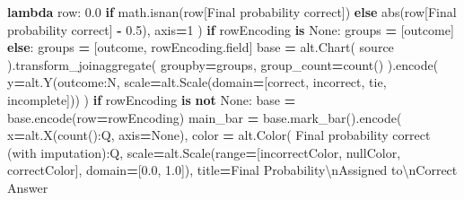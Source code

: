 \documentclass[
]{article}
\newenvironment{Shaded}{\begin{snugshade}}{\end{snugshade}}
\newcommand{\BuiltInTok}[1]{#1}
\newcommand{\CharTok}[1]{\textcolor[rgb]{0.31,0.60,0.02}{#1}}
\newcommand{\ControlFlowTok}[1]{\textcolor[rgb]{0.13,0.29,0.53}{\textbf{#1}}}
\newcommand{\DecValTok}[1]{\textcolor[rgb]{0.00,0.00,0.81}{#1}}
\newcommand{\FloatTok}[1]{\textcolor[rgb]{0.00,0.00,0.81}{#1}}
\newcommand{\KeywordTok}[1]{\textcolor[rgb]{0.13,0.29,0.53}{\textbf{#1}}}
\newcommand{\NormalTok}[1]{#1}
\newcommand{\OperatorTok}[1]{\textcolor[rgb]{0.81,0.36,0.00}{\textbf{#1}}}
\newcommand{\StringTok}[1]{\textcolor[rgb]{0.31,0.60,0.02}{#1}}
\newcommand{\VariableTok}[1]{\textcolor[rgb]{0.00,0.00,0.00}{#1}}
\begin{document}
\begin{Shaded}
\begin{Highlighting}[]
        \KeywordTok{lambda}\NormalTok{ row: }\FloatTok{0.0} \ControlFlowTok{if}\NormalTok{ math.isnan(row[}\StringTok{\textquotesingle{}Final probability correct\textquotesingle{}}\NormalTok{])}
        \ControlFlowTok{else} \BuiltInTok{abs}\NormalTok{(row[}\StringTok{\textquotesingle{}Final probability correct\textquotesingle{}}\NormalTok{] }\OperatorTok{{-}} \FloatTok{0.5}\NormalTok{),}
\NormalTok{        axis}\OperatorTok{=}\DecValTok{1}
\NormalTok{    )}
    \ControlFlowTok{if}\NormalTok{ rowEncoding }\KeywordTok{is} \VariableTok{None}\NormalTok{:}
\NormalTok{        groups }\OperatorTok{=}\NormalTok{ [}\StringTok{\textquotesingle{}outcome\textquotesingle{}}\NormalTok{]}
    \ControlFlowTok{else}\NormalTok{:}
\NormalTok{        groups }\OperatorTok{=}\NormalTok{ [}\StringTok{\textquotesingle{}outcome\textquotesingle{}}\NormalTok{, rowEncoding.field]}
\NormalTok{    base }\OperatorTok{=}\NormalTok{ alt.Chart(}
\NormalTok{        source}
\NormalTok{    ).transform\_joinaggregate(}
\NormalTok{        groupby}\OperatorTok{=}\NormalTok{groups,}
\NormalTok{        group\_count}\OperatorTok{=}\StringTok{\textquotesingle{}count()\textquotesingle{}}
\NormalTok{    ).encode(}
\NormalTok{        y}\OperatorTok{=}\NormalTok{alt.Y(}\StringTok{\textquotesingle{}outcome:N\textquotesingle{}}\NormalTok{, scale}\OperatorTok{=}\NormalTok{alt.Scale(domain}\OperatorTok{=}\NormalTok{[}\StringTok{\textquotesingle{}correct\textquotesingle{}}\NormalTok{, }\StringTok{\textquotesingle{}incorrect\textquotesingle{}}\NormalTok{, }\StringTok{\textquotesingle{}tie\textquotesingle{}}\NormalTok{, }\StringTok{\textquotesingle{}incomplete\textquotesingle{}}\NormalTok{]))}
\NormalTok{    )}
    \ControlFlowTok{if}\NormalTok{ rowEncoding }\KeywordTok{is} \KeywordTok{not} \VariableTok{None}\NormalTok{:}
\NormalTok{        base }\OperatorTok{=}\NormalTok{ base.encode(row}\OperatorTok{=}\NormalTok{rowEncoding)}
\NormalTok{    main\_bar }\OperatorTok{=}\NormalTok{ base.mark\_bar().encode(}
\NormalTok{        x}\OperatorTok{=}\NormalTok{alt.X(}\StringTok{\textquotesingle{}count():Q\textquotesingle{}}\NormalTok{, axis}\OperatorTok{=}\VariableTok{None}\NormalTok{),}
\NormalTok{        color }\OperatorTok{=}\NormalTok{ alt.Color(}
            \StringTok{\textquotesingle{}Final probability correct (with imputation):Q\textquotesingle{}}\NormalTok{,}
\NormalTok{            scale}\OperatorTok{=}\NormalTok{alt.Scale(}\BuiltInTok{range}\OperatorTok{=}\NormalTok{[incorrectColor, nullColor, correctColor], domain}\OperatorTok{=}\NormalTok{[}\FloatTok{0.0}\NormalTok{, }\FloatTok{1.0}\NormalTok{]),}
\NormalTok{            title}\OperatorTok{=}\StringTok{\textquotesingle{}Final Probability}\CharTok{\textbackslash{}n}\StringTok{Assigned to}\CharTok{\textbackslash{}n}\StringTok{Correct Answer\textquotesingle{}}

\end{Highlighting}
\end{Shaded}
\end{document}
